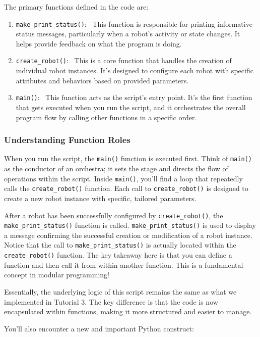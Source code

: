 The primary functions defined in the code are:
\begin{enumerate}\setlength{\itemsep}{5pt}
\item \texttt{make\_print\_status()}: \
This function is responsible for printing informative status messages, particularly when a robot's activity or state changes. It helps provide feedback on what the program is doing.
\item \texttt{create\_robot()}: \
This is a core function that handles the creation of individual robot instances. It's designed to configure each robot with specific attributes and behaviors based on provided parameters.
\item \texttt{main()}: \
This function acts as the script's entry point. It's the first function that gets executed when you run the script, and it orchestrates the overall program flow by calling other functions in a specific order.
\end{enumerate}

\subsubsection{Understanding Function Roles}
When you run the script, the \texttt{main()} function is executed first. Think of \texttt{main()} as the conductor of an orchestra; it sets the stage and directs the flow of operations within the script. Inside \texttt{main()}, you'll find a loop that repeatedly calls the \texttt{create\_robot()} function. Each call to \texttt{create\_robot()} is designed to create a new robot instance with specific, tailored parameters.

After a robot has been successfully configured by \texttt{create\_robot()}, the \texttt{make\_print\_status()} function is called. \texttt{make\_print\_status()} is used to display a message confirming the successful creation or modification of a robot instance. Notice that the call to \texttt{make\_print\_status()} is actually located within the \texttt{create\_robot()} function. The key takeaway here is that you can define a function and then call it from within another function. This is a fundamental concept in modular programming!

Essentially, the underlying logic of this script remains the same as what we implemented in Tutorial 3. The key difference is that the code is now encapsulated within functions, making it more structured and easier to manage.

You'll also encounter a new and important Python construct:


